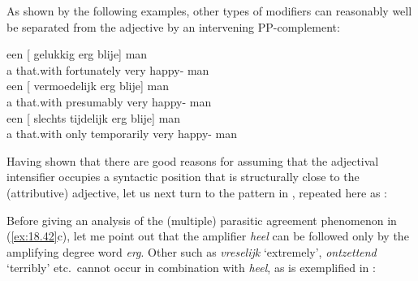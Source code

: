 \documentclass[output=paper]{langsci/langscibook}
\begin{document}
As shown by the following examples, other types of modifiers can reasonably
well be separated from the adjective by an intervening PP-complement:

\ea%
    \label{ex:18.41}
	\ea
	\gll een [   gelukkig        erg        blije]        man\\
        a {} \phantom{〈}that.with      fortunately        {}                  very         {}             happy-\Agr{}    man\\
	\ex
	\gll een [   vermoedelijk    erg        blije]    man\\
        a {}         \phantom{〈}that.with      presumably       {}                     very      {}            happy-\Agr{}    man\\
	\ex
	\gll een [   slechts    tijdelijk      erg        blije]    man\\
        a   {}     \phantom{〈}that.with        only    temporarily      {}
        very         {}           happy-\Agr{}    man\\
	\z
\z

Having shown that there are good reasons for assuming that the adjectival
intensifier occupies a syntactic position that is structurally close to the
(attributive) adjective, let us next turn to the pattern in ,
repeated here as :

\ea%
    \label{ex:18.42}
	\z
\z

Before giving an analysis of the (multiple) parasitic
agreement phenomenon in
(\ref{ex:18.42}c), let me point out that the amplifier \emph{heel} can be
followed only by the amplifying degree word \emph{erg}. Other
 such as \emph{vreselijk} \enquote*{extremely},
\emph{ontzettend} \enquote*{terribly} etc.\ cannot occur in combination with
\emph{heel}, as is exemplified in :
\end{document}
